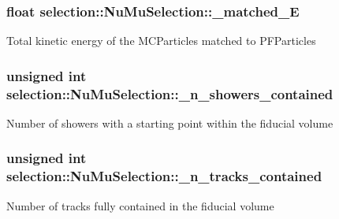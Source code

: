 \subsubsection[{\texorpdfstring{\+\_\+matched\+\_\+E}{_matched_E}}]{\setlength{\rightskip}{0pt plus 5cm}float selection\+::\+Nu\+Mu\+Selection\+::\+\_\+matched\+\_\+E\hspace{0.3cm}{\ttfamily [private]}}\hypertarget{classselection_1_1NuMuSelection_a47c185ab6ea19a597c0d049359e851e1}{}\label{classselection_1_1NuMuSelection_a47c185ab6ea19a597c0d049359e851e1}
Total kinetic energy of the M\+C\+Particles matched to P\+F\+Particles 
\subsubsection[{\texorpdfstring{\+\_\+n\+\_\+showers\+\_\+contained}{_n_showers_contained}}]{\setlength{\rightskip}{0pt plus 5cm}unsigned int selection\+::\+Nu\+Mu\+Selection\+::\+\_\+n\+\_\+showers\+\_\+contained\hspace{0.3cm}{\ttfamily [private]}}\hypertarget{classselection_1_1NuMuSelection_a8583770de84e76b78e7ddfb4b7e733da}{}\label{classselection_1_1NuMuSelection_a8583770de84e76b78e7ddfb4b7e733da}
Number of showers with a starting point within the fiducial volume 
\subsubsection[{\texorpdfstring{\+\_\+n\+\_\+tracks\+\_\+contained}{_n_tracks_contained}}]{\setlength{\rightskip}{0pt plus 5cm}unsigned int selection\+::\+Nu\+Mu\+Selection\+::\+\_\+n\+\_\+tracks\+\_\+contained\hspace{0.3cm}{\ttfamily [private]}}\hypertarget{classselection_1_1NuMuSelection_a4f7501393a59de50a8547b6ff2f286b8}{}\label{classselection_1_1NuMuSelection_a4f7501393a59de50a8547b6ff2f286b8}
Number of tracks fully contained in the fiducial volume 
